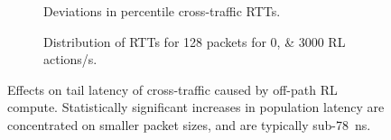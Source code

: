 \documentclass[
conference
,10pt
]{IEEEtran}
\begin{document}
\begin{figure}
	\centering
	\begin{subfigure}{0.45\linewidth}
		\caption{Deviations in  percentile cross-traffic RTTs.\label{fig:dataplane-heat}}
	\end{subfigure}
	\hspace{0.05\linewidth}
		\begin{subfigure}{0.45\linewidth}
		\caption{Distribution of RTTs for \SI{128}{\byte} packets for \numlist{0;3000} RL actions/s.\label{fig:dataplane-example}}
	\end{subfigure}
	\caption{Effects on tail latency of cross-traffic caused by off-path RL compute. Statistically significant increases in population latency are concentrated on smaller packet sizes, and are typically sub-\SI{78}{\nano\second}.\label{fig:dataplane-coop}}
\end{figure}
\end{document}
